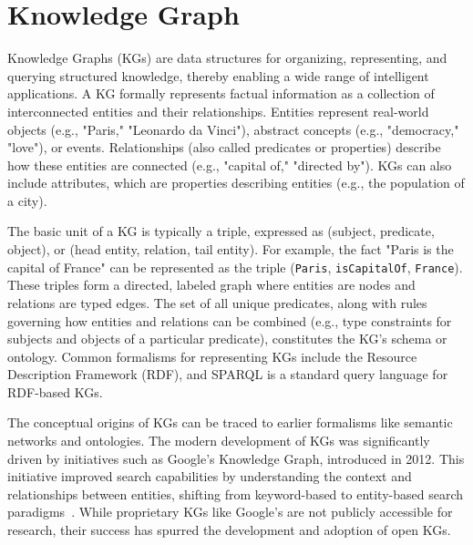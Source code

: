 \section{Knowledge Graph}
\label{sec:rw_kg_fundamentals}

Knowledge Graphs (KGs) are data structures for organizing, representing, and querying structured knowledge, thereby enabling a wide range of intelligent applications. A KG formally represents factual information as a collection of interconnected entities and their relationships. Entities represent real-world objects (e.g., "Paris," "Leonardo da Vinci"), abstract concepts (e.g., "democracy," "love"), or events. Relationships (also called predicates or properties) describe how these entities are connected (e.g., "capital of," "directed by"). KGs can also include attributes, which are properties describing entities (e.g., the population of a city).

The basic unit of a KG is typically a triple, expressed as (subject, predicate, object), or (head entity, relation, tail entity). For example, the fact "Paris is the capital of France" can be represented as the triple (\texttt{Paris}, \texttt{isCapitalOf}, \texttt{France}). These triples form a directed, labeled graph where entities are nodes and relations are typed edges. The set of all unique predicates, along with rules governing how entities and relations can be combined (e.g., type constraints for subjects and objects of a particular predicate), constitutes the KG's schema or ontology. Common formalisms for representing KGs include the Resource Description Framework (RDF), and SPARQL is a standard query language for RDF-based KGs.

The conceptual origins of KGs can be traced to earlier formalisms like semantic networks and ontologies. The modern development of KGs was significantly driven by initiatives such as Google's Knowledge Graph, introduced in 2012. This initiative improved search capabilities by understanding the context and relationships between entities, shifting from keyword-based to entity-based search paradigms~\cite{singhal2012introducing}. While proprietary KGs like Google's are not publicly accessible for research, their success has spurred the development and adoption of open KGs.

